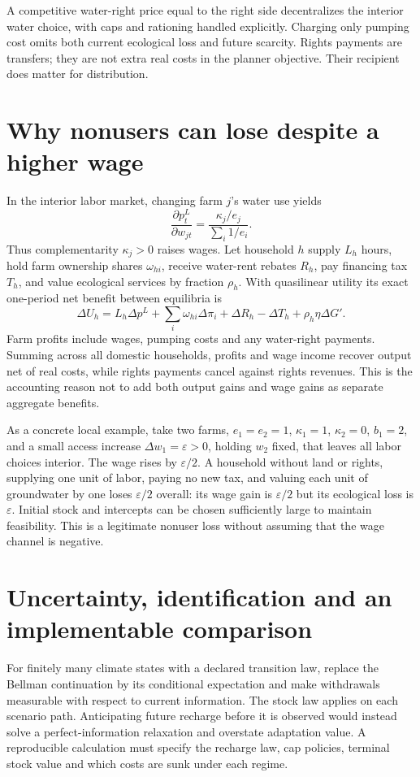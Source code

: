 \documentclass[11pt]{article}
\begin{document}
A competitive water-right price equal to the right side decentralizes the interior water choice, with caps and rationing handled explicitly. Charging only pumping cost omits both current ecological loss and future scarcity. Rights payments are transfers; they are not extra real costs in the planner objective. Their recipient does matter for distribution.

\section*{Why nonusers can lose despite a higher wage}
In the interior labor market, changing farm $j$'s water use yields
\[
 \frac{\partial p_t^L}{\partial w_{jt}}
 =\frac{\kappa_j/e_j}{\sum_i1/e_i}.
\]
Thus complementarity $\kappa_j>0$ raises wages. Let household $h$ supply $L_h$ hours, hold farm ownership shares $\omega_{hi}$, receive water-rent rebates $R_h$, pay financing tax $T_h$, and value ecological services by fraction $\rho_h$. With quasilinear utility its exact one-period net benefit between equilibria is
\[
 \Delta U_h= L_h\Delta p^L+\sum_i\omega_{hi}\Delta\pi_i
 +\Delta R_h-\Delta T_h+\rho_h\eta\Delta G'.
\]
Farm profits include wages, pumping costs and any water-right payments. Summing across all domestic households, profits and wage income recover output net of real costs, while rights payments cancel against rights revenues. This is the accounting reason not to add both output gains and wage gains as separate aggregate benefits.

As a concrete local example, take two farms, $e_1=e_2=1$, $\kappa_1=1$, $\kappa_2=0$, $b_1=2$, and a small access increase $\Delta w_1=\varepsilon>0$, holding $w_2$ fixed, that leaves all labor choices interior. The wage rises by $\varepsilon/2$. A household without land or rights, supplying one unit of labor, paying no new tax, and valuing each unit of groundwater by one loses $\varepsilon/2$ overall: its wage gain is $\varepsilon/2$ but its ecological loss is $\varepsilon$. Initial stock and intercepts can be chosen sufficiently large to maintain feasibility. This is a legitimate nonuser loss without assuming that the wage channel is negative.

\section*{Uncertainty, identification and an implementable comparison}
For finitely many climate states with a declared transition law, replace the Bellman continuation by its conditional expectation and make withdrawals measurable with respect to current information. The stock law applies on each scenario path. Anticipating future recharge before it is observed would instead solve a perfect-information relaxation and overstate adaptation value. A reproducible calculation must specify the recharge law, cap policies, terminal stock value and which costs are sunk under each regime.
\end{document}
